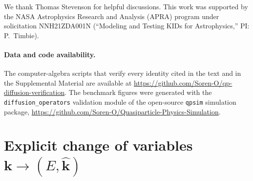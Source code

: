 \documentclass[
  aps,
  prb,
  preprint,
  superscriptaddress,
  longbibliography,
  nofootinbib
]{revtex4-2}
\newcommand{\bk}{\mathbf{k}}
\begin{document}
\begin{acknowledgments}
We thank Thomas Stevenson for helpful discussions.
This work was supported by the NASA Astrophysics Research and Analysis
(APRA) program under solicitation NNH21ZDA001N (``Modeling and Testing
KIDs for Astrophysics,'' PI: P.~Timbie).
\end{acknowledgments}

\paragraph*{Data and code availability.}
The computer-algebra scripts that verify every identity cited in the text
and in the Supplemental Material are available at
\url{https://github.com/Soren-O/qp-diffusion-verification}. The benchmark
figures were generated with the \texttt{diffusion\_operators} validation
module of the open-source \texttt{qpsim} simulation package,
\url{https://github.com/Soren-O/Quasiparticle-Physics-Simulation}.

\appendix

\section{Explicit change of variables \texorpdfstring{\(\bk\to(E,\hat{\bk})\)}{k -> (E, k-hat)}}
\label{app:change_of_variables}
\end{document}
